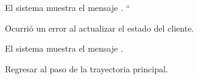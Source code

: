 {\begin{trayectoriaAlternativa}
    \item El sistema muestra el mensaje
      .
``
  \end{trayectoriaAlternativa}

  \begin{trayectoriaAlternativa}
    {Ocurrió un error al actualizar el estado del cliente.}

    \item El sistema muestra el mensaje
      .

    \item Regresar al paso  de la
      trayectoria principal.

  \end{trayectoriaAlternativa}
}
